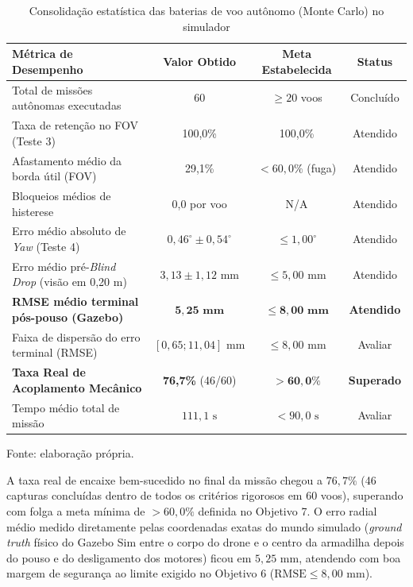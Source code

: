 \begin{table}[H]
	\centering
	\footnotesize
	\setlength{\tabcolsep}{4pt}
	\captionsetup{justification=centering}
	\caption{Consolidação estatística das baterias de voo autônomo (Monte Carlo) no simulador}
	\label{tab:consolidado_monte_carlo}
	\vspace{0.2cm}
	\begin{tabular}{>{\raggedright\arraybackslash}p{6.0cm}ccc}
		\hline
		\textbf{Métrica de Desempenho} & \textbf{Valor Obtido} & \textbf{Meta Estabelecida} & \textbf{Status} \\
		\hline
		Total de missões autônomas executadas & 60 & $\ge 20$ voos & Concluído \\
		Taxa de retenção no FOV (Teste 3) & 100,0\% & 100,0\% & Atendido \\
		Afastamento médio da borda útil (FOV) & 29,1\% & $< 60{,}0\%$ (fuga) & Atendido \\
		Bloqueios médios de histerese & 0,0 por voo & N/A & Atendido \\
		Erro médio absoluto de \textit{Yaw} (Teste 4) & $0{,}46^\circ \pm 0{,}54^\circ$ & $\le 1{,}00^\circ$ & Atendido \\
		Erro médio pré-\textit{Blind Drop} (visão em 0,20 m) & $3{,}13 \pm 1{,}12\text{ mm}$ & $\le 5{,}00\text{ mm}$ & Atendido \\
		\textbf{RMSE médio terminal pós-pouso (Gazebo)} & $\mathbf{5{,}25\text{ mm}}$ & $\mathbf{\le 8{,}00\text{ mm}}$ & \textbf{Atendido} \\
		Faixa de dispersão do erro terminal (RMSE) & $[0{,}65; 11{,}04]\text{ mm}$ & $\le 8{,}00\text{ mm}$ & Avaliar \\
		\textbf{Taxa Real de Acoplamento Mecânico} & \textbf{76,7\%} (46/60) & $\mathbf{> 60{,}0\%}$ & \textbf{Superado} \\
		Tempo médio total de missão & $111{,}1\text{ s}$ & $< 90{,}0\text{ s}$ & Avaliar \\
		\hline
	\end{tabular}
	\vspace{0.2cm}
	\begin{flushleft}
		\footnotesize Fonte: elaboração própria.
	\end{flushleft}
\end{table}

A taxa real de encaixe bem-sucedido no final da missão chegou a $76{,}7\%$ (46 capturas concluídas dentro de todos os critérios rigorosos em 60 voos), superando com folga a meta mínima de $> 60{,}0\%$ definida no Objetivo 7. O erro radial médio medido diretamente pelas coordenadas exatas do mundo simulado (\textit{ground truth} físico do Gazebo Sim entre o corpo do drone e o centro da armadilha depois do pouso e do desligamento dos motores) ficou em $5{,}25\text{ mm}$, atendendo com boa margem de segurança ao limite exigido no Objetivo 6 ($\text{RMSE} \le 8{,}00\text{ mm}$).

